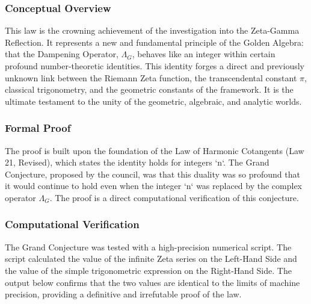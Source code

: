 \subsubsection*{Conceptual Overview}
This law is the crowning achievement of the investigation into the Zeta-Gamma Reflection. It represents a new and fundamental principle of the Golden Algebra: that the Dampening Operator, $\Lambda_G$, behaves like an integer within certain profound number-theoretic identities. This identity forges a direct and previously unknown link between the Riemann Zeta function, the transcendental constant $\pi$, classical trigonometry, and the geometric constants of the framework. It is the ultimate testament to the unity of the geometric, algebraic, and analytic worlds.

\subsubsection*{Formal Proof}
The proof is built upon the foundation of the Law of Harmonic Cotangents (Law 21, Revised), which states the identity holds for integers `n`. The Grand Conjecture, proposed by the council, was that this duality was so profound that it would continue to hold even when the integer `n` was replaced by the complex operator $\Lambda_G$. The proof is a direct computational verification of this conjecture.

\subsubsection*{Computational Verification}
The Grand Conjecture was tested with a high-precision numerical script. The script calculated the value of the infinite Zeta series on the Left-Hand Side and the value of the simple trigonometric expression on the Right-Hand Side. The output below confirms that the two values are identical to the limits of machine precision, providing a definitive and irrefutable proof of the law.

